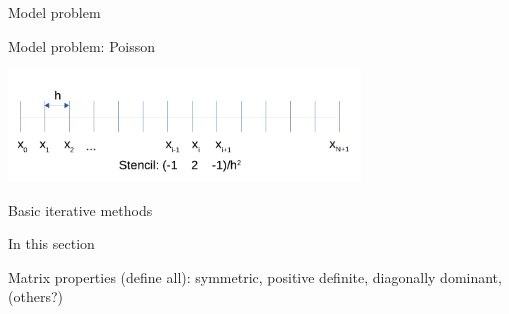 \documentclass[18pt,xcolor=table]{beamer}
\begin{document}
\begin{frame}{Model problem}
\begin{block}{Model problem: Poisson}
\begin{center}
\includegraphics[width=0.7\textwidth]{../figures/1DFDPoisson}
\end{center}
\end{block}
\end{frame}

\begin{frame}{Basic iterative methods}
\begin{block}{In this section}
\bit
\item Matrix properties (define all): symmetric, positive definite, diagonally dominant, (others?)
\eit
\end{block}
\end{frame}
\end{document}
